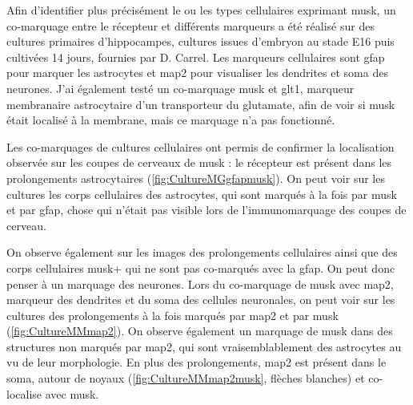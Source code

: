 	Afin d'identifier plus précisément le ou les types cellulaires exprimant \gls{musk}, un co-marquage entre le récepteur et différents marqueurs a été réalisé sur des cultures primaires d'hippocampes, cultures issues d'embryon au stade E16 puis cultivées 14 jours, fournies par D. Carrel. Les marqueurs cellulaires sont \gls{gfap} pour marquer les astrocytes et \gls{map2} pour visualiser les dendrites et soma des neurones. J'ai également testé un co-marquage \gls{musk} et \gls{glt1}, marqueur membranaire astrocytaire d'un transporteur du glutamate, afin de voir si \gls{musk} était localisé à la membrane, mais ce marquage n'a pas fonctionné.
	
	Les co-marquages de cultures cellulaires ont permis de confirmer la localisation observée sur les coupes de cerveaux de \gls{musk} : le récepteur est présent dans les prolongements astrocytaires (\cref{fig:CultureMGgfapmusk}). On peut voir sur les cultures les corps cellulaires des astrocytes, qui sont marqués à la fois par \gls{musk} et par \gls{gfap}, chose qui n'était pas visible lors de l'immunomarquage des coupes de cerveau.
	
	On observe également sur les images des prolongements cellulaires ainsi que des corps cellulaires \gls{musk}+ qui ne sont pas co-marqués avec la \gls{gfap}. On peut donc penser à un marquage des neurones.  Lors du co-marquage de \gls{musk} avec \gls{map2}, marqueur des dendrites et du soma des cellules neuronales, on peut voir sur les cultures des prolongements à la fois marqués par \gls{map2} et par \gls{musk} (\cref{fig:CultureMMmap2}). On observe également un marquage de \gls{musk} dans des structures non marqués par \gls{map2}, qui sont vraisemblablement des astrocytes au vu de leur morphologie. En plus des prolongements, \gls{map2} est présent dans le soma, autour de noyaux (\cref{fig:CultureMMmap2musk}, flèches blanches) et co-localise avec \gls{musk}. 
	
